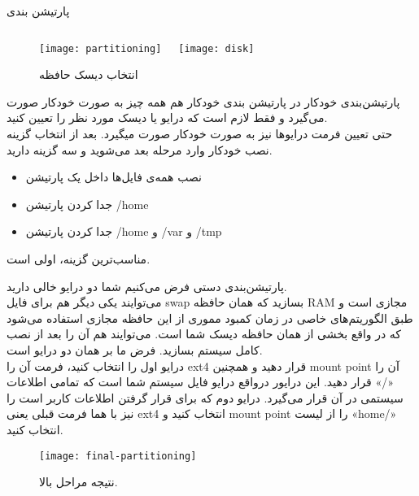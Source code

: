 \begin{frame}{پارتیشن بندی}
  \begin{figure}
    \begin{columns}
      \texttt{[image: partitioning]}
      \caption{انتخاب روش پارتیشن بندی~\cite{fig:deb_partitioning,}}
      \texttt{[image: disk]}
      \caption{انتخاب دیسک حافظه~\cite{fig:deb_disk}}
    \end{columns}
  \end{figure}
\end{frame}

\begin{frame}{پارتیشن‌بندی خودکار}
  در پارتیشن بندی خودکار هم همه چیز به صورت خودکار صورت می‌گیرد و فقط لازم است که درایو یا دیسک مورد نظر را تعیین کنید.\\
  حتی تعیین فرمت درایوها نیز به صورت خودکار صورت میگیرد.
  بعد از انتخاب گزینه نصب خودکار وارد مرحله بعد می‌شوید و سه گزینه دارید.\\
  \begin{itemize}
    \item نصب همه‌ی فایل‌ها داخل یک پارتیشن
    \item جدا کردن پارتیشن /home
    \item جدا کردن پارتیشن /home و /var و /tmp
  \end{itemize}
  مناسب‌ترین گزینه، اولی است.
\end{frame}
\begin{frame}{پارتیشن‌بندی دستی}
  فرض می‌کنیم شما دو درایو خالی دارید.\\
  می‌توایند یکی دیگر هم برای فایل swap بسازید که همان حافظه RAM مجازی است و طبق الگوریتم‌های خاصی در زمان کمبود مموری از این حافظه مجازی استفاده می‌شود که در واقع بخشی از همان حافظه دیسک شما است. می‌توایند هم آن را بعد از نصب کامل سیستم بسازید.
  فرض ما بر همان دو درایو است.\\
  درایو اول را انتخاب کنید، فرمت آن را ext4 قرار دهید و همچنین mount point آن را «/» قرار دهید. این درایور درواقع درایو فایل سیستم شما است که تمامی اطلاعات سیستمی در آن قرار می‌گیرد.
  درایو دوم که برای قرار گرفتن اطلاعات کاربر است را نیز با هما فرمت قبلی یعنی ext4 انتخاب کنید و mount point را از لیست «home/» انتخاب کنید.\\
  \begin{figure}
    \texttt{[image: final-partitioning]}
    \caption{ نتیجه مراحل بالا.~\cite{fig:finish_partitioning}}
  \end{figure}
\end{frame}
